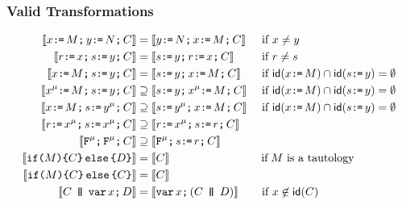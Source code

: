 \documentclass[t,aspectratio=169]{beamer} %
\begin{document}
\begin{frame}
  \frametitle{Valid Transformations}
  \begin{align*}
    \sem{\aLoc \GETS \aExp \SEMI \bLoc  \GETS \bExp\SEMI\aCmd} &=
    \sem{\bLoc  \GETS \bExp\SEMI \aLoc \GETS \aExp\SEMI\aCmd} &&\text{ if } \aLoc\neq\bLoc
    \\
    \sem{\aReg \GETS \aLoc \SEMI \bReg  \GETS \bLoc\SEMI\aCmd} &=
    \sem{\bReg  \GETS \bLoc\SEMI \aReg \GETS \aLoc\SEMI\aCmd} &&\text{ if } \aReg\neq\bReg
    \\
    \sem{\aLoc \GETS \aExp  \SEMI \bReg  \GETS \bLoc \SEMI\aCmd} &=
    \sem{\bReg  \GETS \bLoc \SEMI\aLoc \GETS \aExp\SEMI\aCmd} &&\text{ if } \disjoint{{\free(\aLoc \GETS \aExp)}}{{\free(\bReg  \GETS \bLoc)}}
    \\
    \sem{x^\amode \GETS \aExp \SEMI\bReg \GETS y \SEMI\aCmd} &\supseteq
    \sem{\bReg \GETS y  \SEMI x^\amode\GETS \aExp \SEMI \aCmd} 
    &&\text{ if } \disjoint{{\free(\aLoc \GETS \aExp)}}{{\free(\bReg  \GETS \bLoc)}}
    \\
    \sem{x \GETS \aExp \SEMI\bReg \GETS y^\amode \SEMI\aCmd} &\supseteq
    \sem{\bReg \GETS y^\amode  \SEMI x\GETS \aExp \SEMI \aCmd} 
    &&\text{ if } \disjoint{{\free(\aLoc \GETS \aExp)}}{{\free(\bReg  \GETS \bLoc)}}
    \\
    \sem{\aReg \GETS \aLoc^\amode \SEMI \bReg  \GETS \aLoc^\amode\SEMI\aCmd} &\supseteq 
    \sem{\aReg \GETS \aLoc^\amode \SEMI \bReg  \GETS \aReg\SEMI\aCmd}
    \\
    \sem{\FENCE^\amode \SEMI \FENCE^\amode\SEMI\aCmd} &\supseteq 
    \sem{\FENCE^\amode \SEMI \bReg  \GETS \aReg\SEMI\aCmd}
    \\
    \sem{\IF{\aExp}\THEN\aCmd\ELSE\bCmd\FI} &=
    \sem{\aCmd}
    &&\textif \aExp \text{ is a tautology}
    \\
    \sem{\IF{\aExp}\THEN\aCmd\ELSE\aCmd\FI} &=
    \sem{\aCmd}
    \\
    \sem{\aCmd\PAR \VAR\aLoc\SEMI\bCmd} &=
    \sem{\VAR\aLoc\SEMI(\aCmd\PAR\bCmd)}
    &&\text{ if } \aLoc\not\in\free(\aCmd)
  \end{align*}  
\end{frame}
\end{document}

